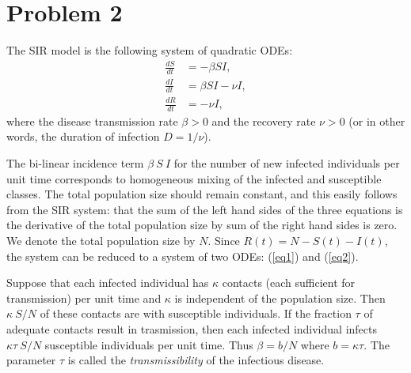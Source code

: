 \section*{Problem 2}
	The SIR model is the following system of quadratic ODEs:
	\begin{align}
		\frac{dS}{dt} &= -\beta SI, \label{eq1}\\
		\frac{dI}{dt} &= \beta SI - \nu I, \label{eq2}\\
		\frac{dR}{dt} &= -\nu I, \label{eq3}
	\end{align}
	where the disease transmission rate $\beta > 0$ and the recovery rate $\nu > 0$ (or in other words, the duration of infection $D = 1/\nu$).
	
	The bi-linear incidence term $\beta\ S\ I$ for the number of new infected individuals per unit time corresponds to homogeneous mixing of the infected and susceptible classes. The total population size should remain constant, and this easily follows from the SIR system: that the sum of the left hand sides of the three equations is the derivative of the total population size by sum of the right hand sides is zero. We denote the total population size by $N$. Since $R(t) = N - S(t) - I(t)$, the system can be reduced to a system of two ODEs: (\ref{eq1}) and (\ref{eq2}).
	
	Suppose that each infected individual has $\kappa$ contacts (each sufficient for transmission) per unit time and $\kappa$ is independent of the population size. Then $\kappa\ S/N$ of these contacts are with susceptible individuals. If the fraction $\tau$ of adequate contacts result in trasmission, then each infected individual infects $\kappa\tau\ S/N$ susceptible individuals per unit time. Thus $\beta = b/N$ where $b = \kappa\tau$. The parameter $\tau$ is called the \textit{transmissibility} of the infectious disease.
